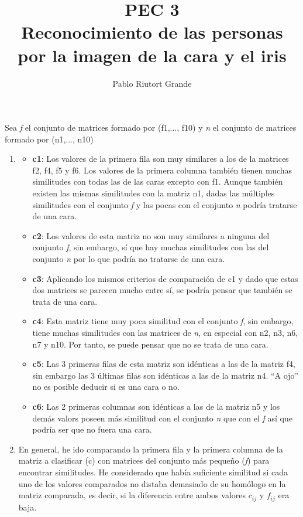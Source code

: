 \documentclass[10pt,a4paper]{article}
\author{Pablo Riutort Grande}
\title{PEC 3\\ \vspace{1cm}\textbf{Reconocimiento de las personas por la imagen de la cara y el iris}}
\begin{document}
\maketitle
\pagebreak
\section{}
Sea \textit{f} el conjunto de matrices formado por (f1,..., f10) y \textit{n} el conjunto de matrices formado por (n1,..., n10)
\begin{enumerate}[label=\textbf{\alph*)}]
\item
\begin{itemize}
\item \textbf{c1}: Los valores de la primera fila son muy similares a los de la matrices f2, f4, f5 y f6. Los valores de la primera columna también tienen muchas similitudes con todas las de las caras excepto con f1. Aunque también existen las mismas similitudes con la matriz n1, dadas las múltiples similitudes con el conjunto \textit{f} y las pocas con el conjunto \textit{n} podría tratarse de una cara.
\item \textbf{c2}: Los valores de esta matriz no son muy similares a ninguna del conjunto \textit{f}, sin embargo, sí que hay muchas similitudes con las del conjunto \textit{n} por lo que podría no tratarse de una cara.
\item \textbf{c3}: Aplicando los mismos criterios de comparación de c1 y dado que estas dos matrices se parecen mucho entre sí, se podría pensar que también se trata de una cara.
\item \textbf{c4}: Esta matriz tiene muy poca similitud con el conjunto \textit{f}, sin embargo, tiene muchas similitudes con las matrices de \textit{n}, en especial con n2, n3, n6, n7 y n10. Por tanto, se puede pensar que no se trata de una cara.
\item \textbf{c5}: Las 3 primeras filas de esta matriz son idénticas a las de la matriz f4, sin embargo las 3 últimas filas son idénticas a las de la matriz n4. ``A ojo'' no es posible deducir si es una cara o no.
\item \textbf{c6}: Las 2 primeras columnas son idénticas a las de la matriz n5 y los demás valors poseen más similitud con el conjunto \textit{n} que con el \textit{f} así que podría ser que no fuera una cara.
\end{itemize}
\item En general, he ido comparando la primera fila y la primera columna de la matriz a clasificar (c) con matrices del conjunto más pequeño (\textit{f}) para encontrar similitudes. He considerado que había suficiente similitud si cada uno de los valores comparados no distaba demasiado de su homólogo en la matriz comparada, es decir, si la diferencia entre ambos valores $c_{ij}$ y $f_{ij}$ era baja.\\

\end{enumerate}
\end{document}
